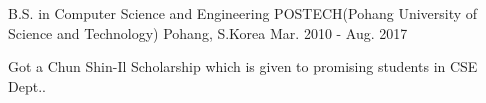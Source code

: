 

\begin{cventries}

  \cventry
    {B.S. in Computer Science and Engineering} %
    {POSTECH(Pohang University of Science and Technology)} %
    {Pohang, S.Korea} %
    {Mar. 2010 - Aug. 2017} %
    {
      \begin{cvitems} %
        \item {Got a Chun Shin-Il Scholarship which is given to promising students in CSE Dept..}
      \end{cvitems}
    }

\end{cventries}
